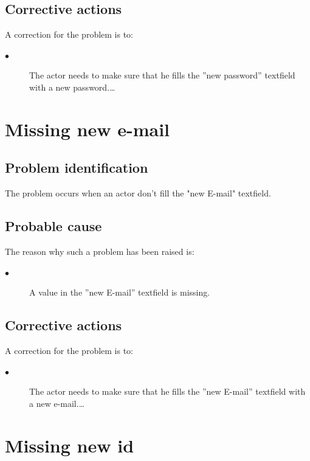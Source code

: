 \subsection{Corrective actions}

A correction for the problem is to:\\
\begin{description}
\item[$\bullet$] The actor needs to make sure that he fills the
''new password'' textfield with a new password.\ldots

\end{description}




\section{Missing new e-mail} 

\subsection{Problem identification}
The problem occurs when an actor don't fill the "new E-mail" textfield.

\subsection{Probable cause}

The reason why such a problem has been raised is:\\
\begin{description}
\item[$\bullet$] A value in the ''new E-mail'' textfield is missing.
\end{description}


\subsection{Corrective actions}

A correction for the problem is to:\\
\begin{description}
\item[$\bullet$] The actor needs to make sure that he fills the
''new E-mail'' textfield with a new e-mail.\ldots

\end{description}




\section{Missing new id} 


